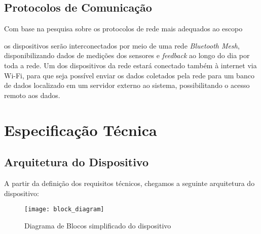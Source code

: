 \documentclass[../monografia.tex]{subfiles}
\begin{document}
\subsection{Protocolos de Comunicação}



Com base na pesquisa sobre os protocolos de rede mais adequados ao escopo

os dispositivos serão interconectados por meio de uma rede \textit{Bluetooth Mesh}, disponibilizando dados de medições dos sensores e \textit{feedback} ao longo do dia por toda a rede. Um dos dispositivos da rede estará conectado também à internet via Wi-Fi, para que seja possível enviar os dados coletados pela rede para um banco de dados localizado em um servidor externo ao sistema, possibilitando o acesso remoto aos dados.

\section{Especificação Técnica}

\subsection{Arquitetura do Dispositivo} %
A partir da definição dos requisitos técnicos, chegamos a seguinte arquitetura do dispositivo:

\begin{figure}[h]
    \centering
    \texttt{[image: block\_diagram]}
    \caption{Diagrama de Blocos simplificado do dispositivo}
    \label{fig:Diagrama de Blocos}
\end{figure}
\end{document}
